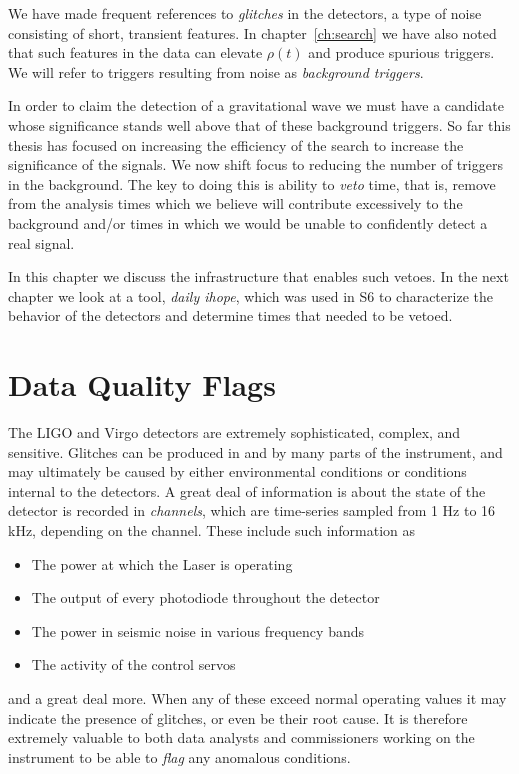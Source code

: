 We have made frequent references to \emph{glitches} in the detectors,
a type of noise consisting of short, transient features.  In
chapter~\ref{ch:search} we have also noted that such features in the
data can elevate $\rho(t)$ and produce spurious triggers.  We will
refer to triggers resulting from noise as \emph{background triggers}.

In order to claim the detection of a gravitational wave we must have a
candidate whose significance stands well above that of these
background triggers.  So far this thesis has focused on increasing the
efficiency of the search to increase the significance of the signals.
We now shift focus to reducing the number of triggers in the
background.  The key to doing this is ability to \emph{veto} time,
that is, remove from the analysis times which we believe will
contribute excessively to the background and/or times in which we
would be unable to confidently detect a real signal.

In this chapter we discuss the infrastructure that enables such
vetoes.  In the next chapter we look at a tool, \emph{daily ihope},
which was used in S6 to characterize the behavior of the detectors and
determine times that needed to be vetoed.


\section{Data Quality Flags}

The LIGO and Virgo detectors are extremely sophisticated, complex, and
sensitive.  Glitches can be produced in and by many parts of the
instrument, and may ultimately be caused by either environmental
conditions or conditions internal to the detectors.  A great deal of
information is about the state of the detector is recorded in
\emph{channels}, which are time-series sampled from 1 Hz to 16 kHz,
depending on the channel.  These include such information as
\begin{itemize}
\item The power at which the Laser is operating
\item The output of every photodiode throughout the detector
\item The power in seismic noise in various frequency bands
\item The activity of the control servos
\end{itemize}
%
and a great deal more.  When any of these exceed normal operating
values it may indicate the presence of glitches, or even be their root
cause.  It is therefore extremely valuable to both data analysts and 
commissioners working on the instrument to be able to \emph{flag} any
anomalous conditions.

